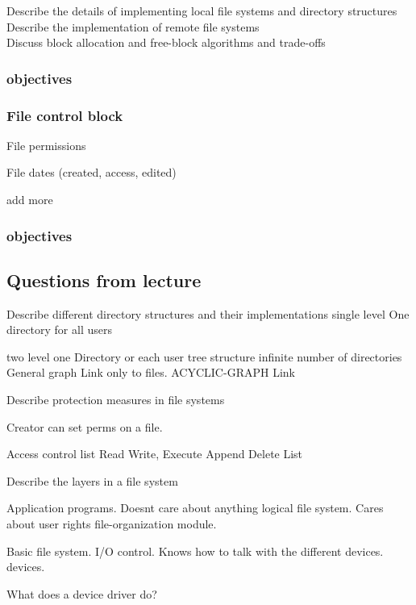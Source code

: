 \documentclass[a4paper,10pt,titlepage]{report}
\begin{document}
Describe the details of implementing local file systems
and directory structures\\


Describe the implementation of remote file systems \\

Discuss block allocation and free-block algorithms and
trade-offs
\\
\subsubsection{objectives}


\subsubsection{File control block}
File permissions

File dates (created, access, edited)

add more


\subsubsection{objectives}

\subsection{Questions from lecture}

Describe different directory structures and their implementations 
	single level
		One directory for all users
		
	two level
		one Directory or each user
	tree structure
		infinite number of directories
	General graph
		Link only to files.
	ACYCLIC-GRAPH
		Link

Describe protection measures in file systems

	Creator can set perms on a file.	
	
	Access control list
		Read
		Write,
		Execute
		Append
		Delete
		List
		
	

Describe the layers in a file system

	Application programs.
		Doesnt care about anything
	logical file system.
		Cares about user rights
	file-organization module.
		
	Basic file system.
	I/O control.
		Knows how to talk with the different devices.
	devices.


What does a device driver do?
	
\end{document}
